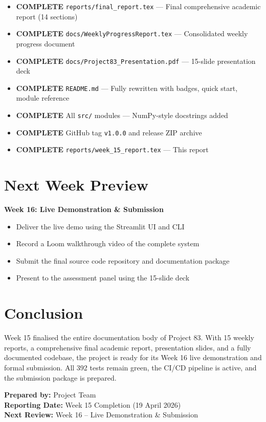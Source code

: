 \documentclass[a4paper,11pt]{article}
\newcommand{\statusgood}[1]{\colorbox{green!20}{\textbf{#1}}}
\begin{document}
\begin{itemize}[leftmargin=*]
    \item \statusgood{COMPLETE} \texttt{reports/final\_report.tex} --- Final comprehensive academic report (14 sections)
    \item \statusgood{COMPLETE} \texttt{docs/WeeklyProgressReport.tex} --- Consolidated weekly progress document
    \item \statusgood{COMPLETE} \texttt{docs/Project83\_Presentation.pdf} --- 15-slide presentation deck
    \item \statusgood{COMPLETE} \texttt{README.md} --- Fully rewritten with badges, quick start, module reference
    \item \statusgood{COMPLETE} All \texttt{src/} modules --- NumPy-style docstrings added
    \item \statusgood{COMPLETE} GitHub tag \texttt{v1.0.0} and release ZIP archive
    \item \statusgood{COMPLETE} \texttt{reports/week\_15\_report.tex} --- This report
\end{itemize}

\section{Next Week Preview}

\textbf{Week 16: Live Demonstration \& Submission}

\begin{itemize}[leftmargin=*]
    \item Deliver the live demo using the Streamlit UI and CLI
    \item Record a Loom walkthrough video of the complete system
    \item Submit the final source code repository and documentation package
    \item Present to the assessment panel using the 15-slide deck
\end{itemize}

\section{Conclusion}

Week 15 finalised the entire documentation body of Project 83. With 15 weekly reports, a comprehensive final academic report, presentation slides, and a fully documented codebase, the project is ready for its Week 16 live demonstration and formal submission. All 392 tests remain green, the CI/CD pipeline is active, and the submission package is prepared.

\vspace{5mm}
\noindent\textbf{Prepared by:} Project Team \\
\textbf{Reporting Date:} Week 15 Completion (19 April 2026) \\
\textbf{Next Review:} Week 16 -- Live Demonstration \& Submission
\end{document}
